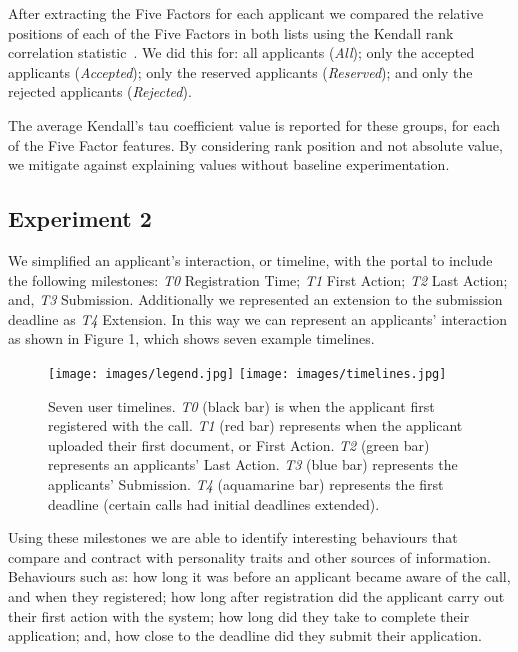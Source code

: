 \documentclass[letterpaper]{article}
\begin{document}
After extracting the Five Factors for each applicant we compared the
relative positions of each of the Five Factors in both lists using the
Kendall rank correlation statistic~\cite{kendall:1938}. We did
this for: all applicants ({\emph{All}}); only the accepted applicants
({\emph{Accepted}}); only the reserved applicants ({\emph{Reserved}});
and only the rejected applicants ({\emph{Rejected}}).

The average Kendall's tau coefficient value is reported for these
groups, for each of the Five Factor features. By considering rank
position and not absolute value, we mitigate against explaining values
without baseline experimentation.

\subsection{Experiment 2}

We simplified an applicant's interaction, or timeline, with the portal
to include the following milestones: {\emph{T0}} Registration Time;
{\emph{T1}} First Action; {\emph{T2}} Last Action; and, {\emph{T3}}
Submission. Additionally we represented an extension to the submission
deadline as {\emph{T4}} Extension. In this way we can represent an
applicants’ interaction as shown in Figure 1, which shows seven
example timelines.

\begin{figure}[!ht]
\centering
\texttt{[image: images/legend.jpg]}
\texttt{[image: images/timelines.jpg]}
\caption{Seven user timelines. {\emph{T0}} (black bar) is when the applicant first
registered with the call. {\emph{T1}} (red bar) represents when the applicant
uploaded their first document, or First Action. {\emph{T2}} (green bar)
represents an applicants’ Last Action. {\emph{T3}} (blue bar) represents the
applicants’ Submission. {\emph{T4}} (aquamarine bar) represents the first
deadline (certain calls had initial deadlines extended).}
\label{fig:timelines}
\end{figure}

Using these milestones we are able to identify interesting behaviours
that compare and contract with personality traits and other sources of
information. Behaviours such as: how long it was before an applicant
became aware of the call, and when they registered; how long after
registration did the applicant carry out their first action with
the system; how long did they take to complete their application; and,
how close to the deadline did they submit their application.
\end{document}
